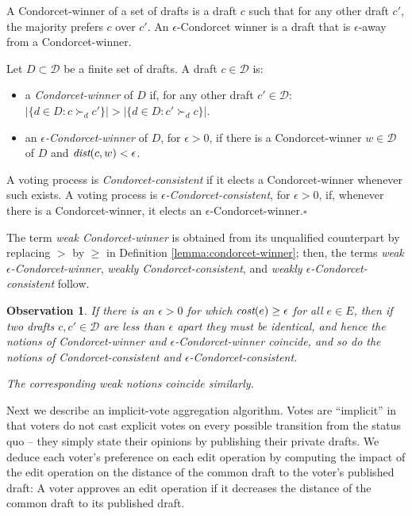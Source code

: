 \documentclass[sigconf]{aamas}  %
\newtheorem{observation}{Observation}
\newcommand{\qqed}{\hfill$\square$}
\newcommand{\calD}{\mathcal{D}}
\newcommand{\prefers}[1]{\succ_{#1}}
\newcommand{\dist}{\emph{dist}}
\newcommand{\cost}{\emph{cost}}
\begin{document}
A Condorcet-winner of a set of drafts is a draft $c$ such that for any other draft $c'$, the majority prefers $c$ over $c'$.  An $\epsilon$-Condorcet winner is a draft that is $\epsilon$-away from a Condorcet-winner.

\begin{definition}\label{lemma:condorcet-winner}
%
Let $D \subset \calD$ be a finite set of drafts. A draft $c \in \calD$ is:
%
\begin{itemize}

\item
a \emph{Condorcet-winner} of $D$ if, for any other draft $c' \in \calD$: \\ $|\{ d \in D : c \prefers{d} c' \}| > |\{ d \in D : c' \prefers{d} c \}|$.

\item
an \emph{$\epsilon$-Condorcet-winner} of $D$, for $\epsilon > 0$, if there is a Condorcet-winner $w \in \calD$ of $D$ and $\dist(c,w) < \epsilon$.

\end{itemize}
%
A voting process is \emph{Condorcet-consistent} if it elects a Condorcet-winner whenever such exists.
A voting process is \emph{$\epsilon$-Condorcet-consistent}, for $\epsilon > 0$, if, whenever there is a Condorcet-winner, it elects an $\epsilon$-Condorcet-winner.\qqed 
\end{definition}

The term \emph{weak Condorcet-winner} is obtained from its unqualified counterpart by replacing $>$ by $\ge$ in Definition \ref{lemma:condorcet-winner}; then, the terms \emph{weak $\epsilon$-Condorcet-winner}, \emph{weakly Condorcet-consistent}, and \emph{weakly $\epsilon$-Condorcet-consistent} follow.

\begin{observation}\label{observation:coincides}
%
If there is an $\epsilon >0$ for which $\cost(e) \ge \epsilon$ for all $e \in E$, then if two drafts $c, c' \in \calD$ are less than  $\epsilon$ apart they must be identical, and hence the notions of Condorcet-winner and $\epsilon$-Condorcet-winner coincide, and so do the notions of Condorcet-consistent and $\epsilon$-Condorcet-consistent.
 
The corresponding weak notions coincide similarly.
%
\end{observation}

Next we describe an implicit-vote aggregation algorithm. Votes are ``implicit'' in that voters do not cast explicit votes on every possible transition from the status quo -- they simply state their opinions by publishing their private drafts.  We deduce each voter's preference on each edit operation by computing the impact of the edit operation on the distance of the common draft to the voter's published draft: A voter approves an edit operation if it decreases the distance of the common draft to its published draft.
\end{document}
